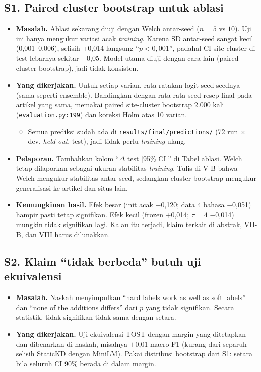 \documentclass[10pt,a4paper]{article}
\begin{document}
\subsection*{S1. Paired cluster bootstrap untuk ablasi}
\begin{itemize}
  \item \textbf{Masalah.} Ablasi sekarang diuji dengan Welch antar-seed ($n=5$ vs $10$). Uji ini hanya mengukur variasi acak \emph{training}. Karena SD antar-seed sangat kecil (0,001--0,006), selisih +0,014 langsung ``$p<0{,}001$'', padahal CI site-cluster di test lebarnya sekitar $\pm$0,05. Model utama diuji dengan cara lain (paired cluster bootstrap), jadi tidak konsisten.
  \item \textbf{Yang dikerjakan.} Untuk setiap varian, rata-ratakan logit seed-seednya (sama seperti ensemble). Bandingkan dengan rata-rata seed resep final pada artikel yang sama, memakai paired site-cluster bootstrap 2.000 kali (\texttt{evaluation.py:199}) dan koreksi Holm atas 10 varian.
    \begin{itemize}
      \item Semua prediksi sudah ada di \texttt{results/final/predictions/} (72 run $\times$ dev, \emph{held-out}, test), jadi tidak perlu \emph{training} ulang.
    \end{itemize}
  \item \textbf{Pelaporan.} Tambahkan kolom ``$\Delta$ test [95\% CI]'' di Tabel ablasi. Welch tetap dilaporkan sebagai ukuran stabilitas \emph{training}. Tulis di V-B bahwa Welch mengukur stabilitas antar-seed, sedangkan cluster bootstrap mengukur generalisasi ke artikel dan situs lain.
  \item \textbf{Kemungkinan hasil.} Efek besar (init acak $-$0,120; data 4 bahasa $-$0,051) hampir pasti tetap signifikan. Efek kecil (frozen +0,014; $\tau=4$ $-$0,014) mungkin tidak signifikan lagi. Kalau itu terjadi, klaim terkait di abstrak, VII-B, dan VIII harus dilunakkan.
\end{itemize}

\subsection*{S2. Klaim ``tidak berbeda'' butuh uji ekuivalensi}
\begin{itemize}
  \item \textbf{Masalah.} Naskah menyimpulkan ``hard labels work as well as soft labels'' dan ``none of the additions differs'' dari $p$ yang tidak signifikan. Secara statistik, tidak signifikan tidak sama dengan setara.
  \item \textbf{Yang dikerjakan.} Uji ekuivalensi TOST dengan margin yang ditetapkan dan dibenarkan di naskah, misalnya $\pm$0,01 macro-F1 (kurang dari separuh selisih StaticKD dengan MiniLM). Pakai distribusi bootstrap dari S1: setara bila seluruh CI 90\% berada di dalam margin.
\end{itemize}
\end{document}
